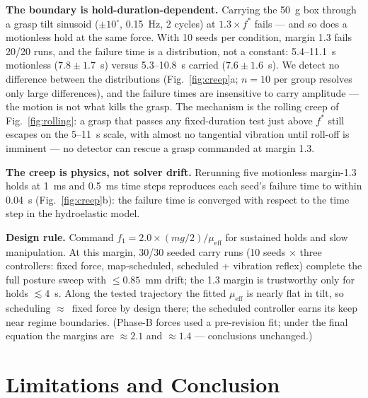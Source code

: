 \documentclass[journal]{IEEEtran}
\newcommand{\mueff}{\mu_{\mathrm{eff}}}
\newcommand{\fstar}{f^{*}}
\begin{document}
\textbf{The boundary is hold-duration-dependent.} Carrying the 50~g box
through a grasp tilt sinusoid ($\pm 10^\circ$, 0.15~Hz, 2 cycles) at
$1.3\times\fstar$ fails --- and so does a motionless hold at the same
force. With 10 seeds per condition, margin 1.3 fails 20/20 runs, and the
failure time is a distribution, not a constant: 5.4--11.1~s motionless
($7.8 \pm 1.7$~s) versus 5.3--10.8~s carried ($7.6 \pm 1.6$~s). We detect
no difference between the distributions (Fig.~\ref{fig:creep}a;
$n = 10$ per group resolves only large differences), and the failure times
are insensitive to carry amplitude --- the motion is not what kills the
grasp. The mechanism is the rolling creep of Fig.~\ref{fig:rolling}: a
grasp that passes any fixed-duration test just above $\fstar$ still escapes
on the 5--11~s scale, with almost no tangential vibration until roll-off is
imminent --- no detector can rescue a grasp commanded at margin 1.3.

\textbf{The creep is physics, not solver drift.} Rerunning five motionless
margin-1.3 holds at 1~ms and 0.5~ms time steps reproduces each seed's
failure time to within 0.04~s (Fig.~\ref{fig:creep}b): the failure time is
converged with respect to the time step in the hydroelastic model.

\textbf{Design rule.} Command
$f_1 = 2.0 \times (mg/2)/\mueff$
for sustained holds and slow manipulation. At this margin, 30/30 seeded
carry runs (10 seeds $\times$ three controllers: fixed force,
map-scheduled, scheduled + vibration reflex) complete the full posture
sweep with ${\le}0.85$~mm drift; the 1.3 margin is trustworthy only for
holds ${\lesssim}4$~s. Along the
tested trajectory the fitted $\mueff$ is nearly flat in tilt, so scheduling
${\approx}$~fixed force by design there; the scheduled controller earns its
keep near regime boundaries. (Phase-B forces used a pre-revision fit; under
the final equation the margins are ${\approx}2.1$ and ${\approx}1.4$ ---
conclusions unchanged.)

\section{Limitations and Conclusion}
\label{sec:limitations}
\end{document}
